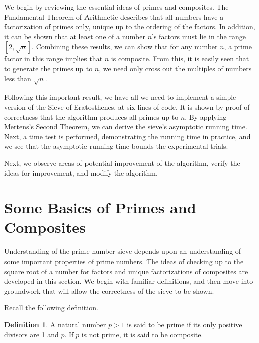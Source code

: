 \documentclass{amsart}
\theoremstyle{definition}
\newtheorem{definition}{Definition}[section]
\theoremstyle{case}
\begin{document}
    We begin by reviewing the essential ideas of primes and composites. The Fundamental Theorem of Arithmetic describes that all numbers have a factorization of primes only, unique up to the ordering of the factors. In addition, it can be shown that at least one of a number $n$'s factors must lie in the range $[2, \sqrt{n}]$. Combining these results, we can show that for any number $n$, a prime factor in this range implies that $n$ is composite. From this, it is easily seen that to generate the primes up to $n$, we need only cross out the multiples of numbers less than $\sqrt{n}$.
    
    Following this important result, we have all we need to implement a simple version of the Sieve of Eratosthenes, at six lines of code. It is shown by proof of correctness that the algorithm produces all primes up to $n$. By applying Mertens's Second Theorem, we can derive the sieve's asymptotic running time. Next, a time test is performed, demonstrating the running time in practice, and we see that the asymptotic running time bounds the experimental trials.
    
    Next, we observe areas of potential improvement of the algorithm, verify the ideas for improvement, and modify the algorithm. 
    
    
    \section{Some Basics of Primes and Composites}
    
	
	Understanding of the prime number sieve depends upon an understanding of some important properties of prime numbers. The ideas of checking up to the square root of a number for factors and unique factorizations of composites are developed in this section. We begin with familiar definitions, and then move into groundwork that will allow the correctness of the sieve to be shown.

	Recall the following definition.
	\begin{definition}
		A natural number $p>1$ is said to be prime if its only positive divisors are 1 and $p$. If $p$ is not prime, it is said to be composite.
	\end{definition}
	
\end{document}
